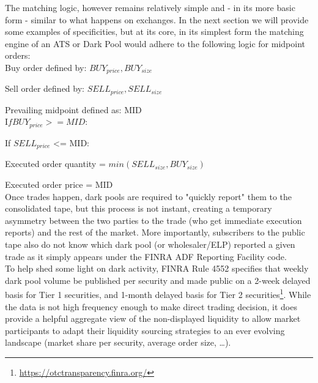 The matching logic, however remains relatively simple and - in its more basic form - similar to what happens on exchanges. In the next section we will provide some examples of specificities, but at its core, in its simplest form the matching engine of an ATS or Dark Pool would adhere to the following logic for midpoint orders: \\

\noindent Buy order defined by: $BUY_{price}, BUY_{size}$ 

\noindent Sell order defined by: $SELL_{price}, SELL_{size}$ 


\noindent Prevailing midpoint defined as: MID \\

\noindent I$f BUY_{price} >= MID:$ 

 
If $SELL_{price}$ <= MID: 

      Executed order quantity = $min(SELL_{size}, BUY_{size})$ 


      Executed order price = MID \\

Once trades happen, dark pools are required to "quickly report" them to the consolidated tape, but this process is not instant, creating a temporary asymmetry between the two parties to the trade (who get immediate execution reports) and the rest of the market. More importantly, subscribers to the public tape also do not know which dark pool (or wholesaler/ELP) reported a given trade as it simply appears under the FINRA ADF Reporting Facility code.\\

To help shed some light on dark activity, FINRA Rule 4552 specifies that weekly dark pool volume be published per security and made public on a 2-week delayed basis for Tier 1 securities, and 1-month delayed basis for Tier 2 securities\footnote{\url{https://otctransparency.finra.org/}}. While the data is not high frequency enough to make direct trading decision, it does provide a helpful aggregate view of the non-displayed liquidity to allow market participants to adapt their liquidity sourcing strategies to an ever evolving landscape (market share per security, average order size, \dots).

